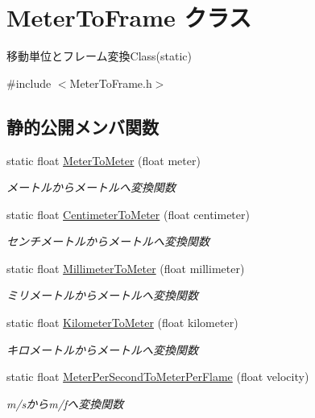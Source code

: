 \hypertarget{class_meter_to_frame}{}\section{Meter\+To\+Frame クラス}
\label{class_meter_to_frame}


移動単位とフレーム変換\+Class(static)  




{\ttfamily \#include $<$Meter\+To\+Frame.\+h$>$}

\subsection*{静的公開メンバ関数}
\begin{DoxyCompactItemize}
\item 
static float \mbox{\hyperlink{class_meter_to_frame_af41224ef315c791ade350ffc5829ffc7}{Meter\+To\+Meter}} (float meter)
\begin{DoxyCompactList}\small\item\em メートルからメートルへ変換関数 \end{DoxyCompactList}\item 
static float \mbox{\hyperlink{class_meter_to_frame_aade64981cce2a79058fc6f0f3d9a9d21}{Centimeter\+To\+Meter}} (float centimeter)
\begin{DoxyCompactList}\small\item\em センチメートルからメートルへ変換関数 \end{DoxyCompactList}\item 
static float \mbox{\hyperlink{class_meter_to_frame_a1f02720bec5d07772fcacc214dbe7b59}{Millimeter\+To\+Meter}} (float millimeter)
\begin{DoxyCompactList}\small\item\em ミリメートルからメートルへ変換関数 \end{DoxyCompactList}\item 
static float \mbox{\hyperlink{class_meter_to_frame_a23532d0215d188bd0915450005ee206a}{Kilometer\+To\+Meter}} (float kilometer)
\begin{DoxyCompactList}\small\item\em キロメートルからメートルへ変換関数 \end{DoxyCompactList}\item 
static float \mbox{\hyperlink{class_meter_to_frame_aa5468938f59eb934bfc6a897a7513812}{Meter\+Per\+Second\+To\+Meter\+Per\+Flame}} (float velocity)
\begin{DoxyCompactList}\small\item\em m/sからm/fへ変換関数 \end{DoxyCompactList}\item 

\end{DoxyCompactItemize}
